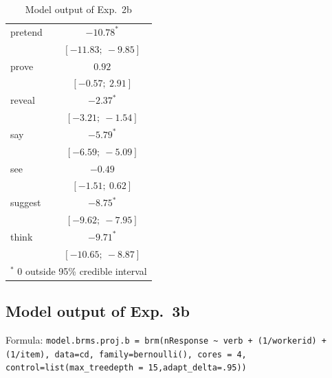 \documentclass[11pt,fleqn]{article}
\newcommand{\6}{\mbox{$[\hspace*{-.6mm}[$}}
\newcommand{\9}{\mbox{$]\hspace*{-.6mm}]$}}
\begin{document}
{\begin{table}
\begin{center}
\begin{tabular}{l c }
pretend     & $-10.78^{*}$        \\
                   & $[-11.83;\ -9.85]$  \\
prove       & $0.92$              \\
                   & $[-0.57;\ 2.91]$    \\
reveal      & $-2.37^{*}$         \\
                   & $[-3.21;\ -1.54]$   \\
say         & $-5.79^{*}$         \\
                   & $[-6.59;\ -5.09]$   \\
see         & $-0.49$             \\
                   & $[-1.51;\ 0.62]$    \\
suggest     & $-8.75^{*}$         \\
                   & $[-9.62;\ -7.95]$   \\
think       & $-9.71^{*}$         \\
                   & $[-10.65;\ -8.87]$  \\
\hline
\multicolumn{2}{l}{\scriptsize{$^*$ 0 outside 95\% credible interval}}
\end{tabular}
\caption{Model output of Exp.~2b}
\label{table:coefficients}
\end{center}
\end{table}

\subsection{Model output of Exp.~3b}

Formula: \tiny \verb|model.brms.proj.b = brm(nResponse ~ verb + (1/workerid) + (1/item), data=cd, family=bernoulli(), cores = 4, control=list(max_treedepth = 15,adapt_delta=.95))| \normalsize


}
\end{document}
